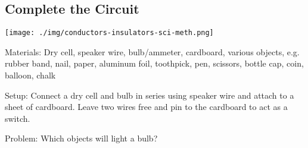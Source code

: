 \subsection{Complete the Circuit}

\begin{center}
\texttt{[image: ./img/conductors-insulators-sci-meth.png]}
\end{center}

\begin{description*}
\item[Materials:]{Dry cell, speaker wire, bulb/ammeter, cardboard, various objects, e.g. rubber band, nail, paper, aluminum foil, toothpick, pen, scissors, bottle cap, coin, balloon, chalk}
\item[Setup:]{Connect a dry cell and bulb in series using speaker wire and attach to a sheet of cardboard. Leave two wires free and pin to the cardboard to act as a switch.}
\item[Problem:]{Which objects will light a bulb?\\

}
\end{description*}
